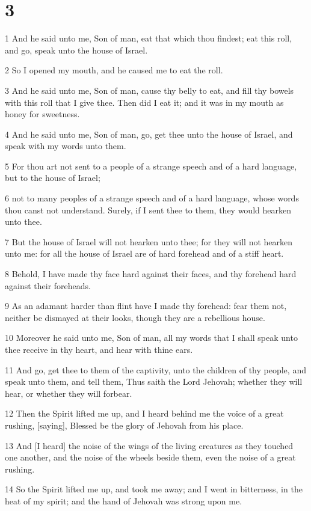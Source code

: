 \chapter{3}

\par 1 And he said unto me, Son of man, eat that which thou findest; eat this roll, and go, speak unto the house of Israel.
\par 2 So I opened my mouth, and he caused me to eat the roll.
\par 3 And he said unto me, Son of man, cause thy belly to eat, and fill thy bowels with this roll that I give thee. Then did I eat it; and it was in my mouth as honey for sweetness.
\par 4 And he said unto me, Son of man, go, get thee unto the house of Israel, and speak with my words unto them.
\par 5 For thou art not sent to a people of a strange speech and of a hard language, but to the house of Israel;
\par 6 not to many peoples of a strange speech and of a hard language, whose words thou canst not understand. Surely, if I sent thee to them, they would hearken unto thee.
\par 7 But the house of Israel will not hearken unto thee; for they will not hearken unto me: for all the house of Israel are of hard forehead and of a stiff heart.
\par 8 Behold, I have made thy face hard against their faces, and thy forehead hard against their foreheads.
\par 9 As an adamant harder than flint have I made thy forehead: fear them not, neither be dismayed at their looks, though they are a rebellious house.
\par 10 Moreover he said unto me, Son of man, all my words that I shall speak unto thee receive in thy heart, and hear with thine ears.
\par 11 And go, get thee to them of the captivity, unto the children of thy people, and speak unto them, and tell them, Thus saith the Lord Jehovah; whether they will hear, or whether they will forbear.
\par 12 Then the Spirit lifted me up, and I heard behind me the voice of a great rushing, [saying], Blessed be the glory of Jehovah from his place.
\par 13 And [I heard] the noise of the wings of the living creatures as they touched one another, and the noise of the wheels beside them, even the noise of a great rushing.
\par 14 So the Spirit lifted me up, and took me away; and I went in bitterness, in the heat of my spirit; and the hand of Jehovah was strong upon me.
